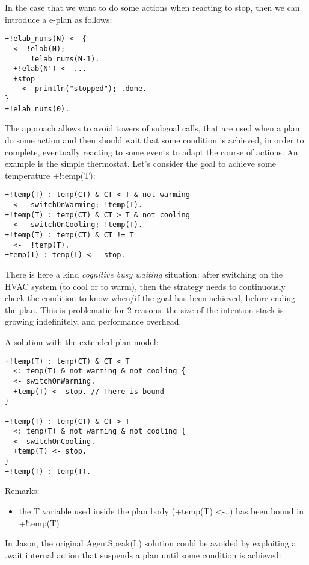 In the case that we want to do some actions when reacting to stop, then we can introduce a e-plan as follows:

{\small
\begin{verbatim}
+!elab_nums(N) <- {
  <- !elab(N);
      !elab_nums(N-1).
  +!elab(N') <- ...
  +stop 
    <- println("stopped"); .done.		
}
+!elab_nums(0).
\end{verbatim}}

\noindent  The approach allows to avoid towers of subgoal calls, that are used when a plan do some action and then should wait that some condition is achieved, in order to complete, eventually reacting to some events to adapt the course of actions. 
%
An example is the simple thermostat. 
%
Let's consider the goal to achieve some temperature +!temp(T):

{\small
\begin{verbatim}
+!temp(T) : temp(CT) & CT < T & not warming
  <-  switchOnWarming; !temp(T).
+!temp(T) : temp(CT) & CT > T & not cooling
  <-  switchOnCooling; !temp(T).
+!temp(T) : temp(CT) & CT != T 
  <-  !temp(T).
+temp(T) : temp(T) <-  stop.
\end{verbatim}}

\noindent There is here a kind \emph{cognitive busy waiting} situation: after switching on the HVAC system (to cool or to warm), then the strategy needs to continuously check the condition to know when/if the goal has been achieved, before ending the plan.
%
This is problematic for 2 reasons: the size of the intention stack is growing indefinitely, and 
performance overhead. 

A solution with the extended plan model:

{\small
\begin{verbatim}
+!temp(T) : temp(CT) & CT < T 
  <: temp(T) & not warming & not cooling {  
  <- switchOnWarming.
  +temp(T) <- stop. // There is bound	
}

+!temp(T) : temp(CT) & CT > T 
  <: temp(T) & not warming & not cooling {  
  <- switchOnCooling.	
  +temp(T) <- stop.		
}
+!temp(T) : temp(T).
\end{verbatim}}

Remarks:
\begin{itemize}
\item the T variable used inside the plan body (+temp(T) <-..) has been bound in +!temp(T)
\end{itemize}

\noindent  In Jason, the original AgentSpeak(L) solution could be avoided  by exploiting a .wait internal action that suspends a plan until some condition is achieved:

